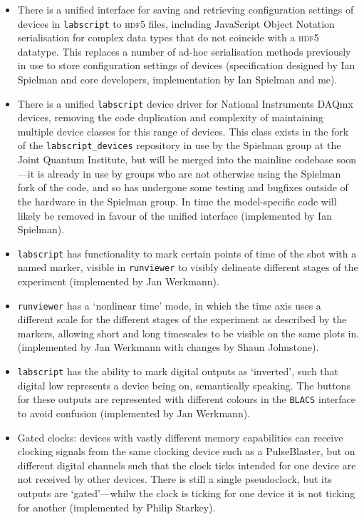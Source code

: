 \begin{itemize}
    \item There is a unified interface for saving and retrieving configuration settings of devices in \texttt{labscript} to \textsc{hdf5} files, including JavaScript Object Notation serialisation for complex data types that do not coincide with a \textsc{hdf5} datatype. This replaces a number of ad-hoc serialisation methods previously in use to store configuration settings of devices (specification designed by Ian Spielman and core developers, implementation by Ian Spielman and me).
    
    \item There is a unified \texttt{labscript} device driver for National Instruments DAQmx devices, removing the code duplication and complexity of maintaining multiple device classes for this range of devices. This class exists in the fork of the \texttt{labscript\_devices} repository in use by the Spielman group at the Joint Quantum Institute, but will be merged into the mainline codebase soon---it is already in use by groups who are not otherwise using the Spielman fork of the code, and so has undergone some testing and bugfixes outside of the hardware in the Spielman group. In time the model-specific code will likely be removed in favour of the unified interface (implemented by Ian Spielman).
    
    \item \texttt{labscript} has functionality to mark certain points of time of the shot with a named marker, visible in \texttt{runviewer} to visibly delineate different stages of the experiment (implemented by Jan Werkmann).
    
    \item \texttt{runviewer} has a `nonlinear time' mode, in which the time axis uses a different scale for the different stages of the experiment as described by the markers, allowing short and long timescales to be visible on the same plots in. (implemented by Jan Werkmann with changes by Shaun Johnstone).
    
    \item \texttt{labscript} has the ability to mark digital outputs as `inverted', such that digital low represents a device being on, semantically speaking. The buttons for these outputs are represented with different colours in the \texttt{BLACS} interface to avoid confusion (implemented by Jan Werkmann).
    
    \item Gated clocks: devices with vastly different memory capabilities can receive clocking signals from the same clocking device such as a PulseBlaster, but on different digital channels such that the clock ticks intended for one device are not received by other devices. There is still a single pseudoclock, but its outputs are `gated'---whilw the clock is ticking for one device it is not ticking for another (implemented by Philip Starkey).
    

\end{itemize}

